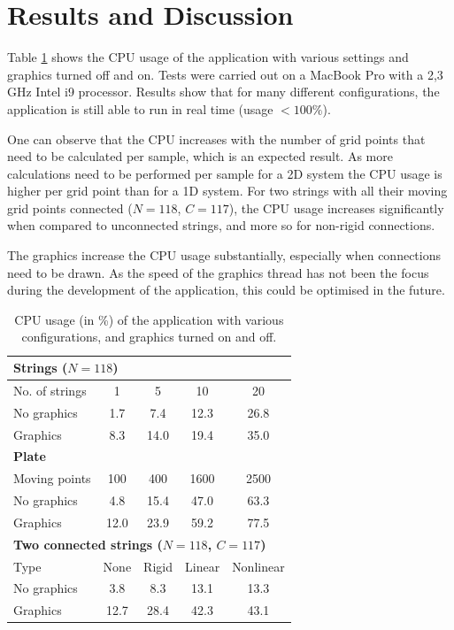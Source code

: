\documentclass{article}
\begin{document}
\section{Results and Discussion}\label{sec:resDiscuss}
Table \ref{tab:CPU} shows the CPU usage of the application with various settings and graphics turned off and on. Tests were carried out on a MacBook Pro with a 2,3 GHz Intel i9 processor. Results show that for many different configurations, the application is still able to run in real time (usage $<100\%$).

One can observe that the CPU increases with the number of grid points that need to be calculated per sample, which is an expected result. As more calculations need to be performed per sample for a 2D system the CPU usage is higher per grid point than for a 1D system. For two strings with all their moving grid points connected ($N=118$, $C=117$), the CPU usage increases significantly when compared to unconnected strings, and more so for non-rigid connections.

The graphics increase the CPU usage substantially, especially when connections need to be drawn. As the speed of the graphics thread has not been the focus during the development of the application, this could be optimised in the future. 

\begin{table}[t]
    \centering
    \begin{tabular}{|l|c|c|c|c|}
        \hline
    \multicolumn{5}{|l|}{\bf Strings ($N = 118$)}\\\hline
    No. of strings & 1 & 5 & 10 & 20 \\\hline
    No graphics & 1.7 & 7.4 & 12.3 &26.8\\
    Graphics & 8.3 & 14.0  & 19.4 & 35.0\\\hline
    \multicolumn{5}{|l|}{\bf Plate}\\\hline
    Moving points & 100 & 400 & 1600 & 2500 \\\hline
    No graphics & 4.8 & 15.4 & 47.0 & 63.3 \\
    Graphics & 12.0 & 23.9 & 59.2 & 77.5\\\hline
    \multicolumn{5}{|l|}{\bf Two connected strings ($N=118$, $C=117$)}\\\hline  
    Type & None & Rigid & Linear & Nonlinear \\\hline
        No graphics & 3.8 & 8.3 & 13.1 & 13.3\\
        Graphics & 12.7 & 28.4 & 42.3 & 43.1\\\hline
    \end{tabular}
    \caption{CPU usage (in \%) of the application with various configurations, and graphics turned on and off. }
    \label{tab:CPU}
\end{table}
\end{document}
